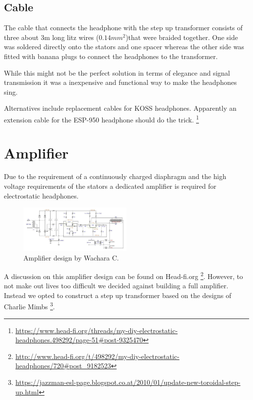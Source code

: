 \documentclass{article}
\begin{document}
\subsection{Cable}
The cable that connects the headphone with the step up transformer consists of three about 3m long litz wires ($0.14mm^2$)that were braided together. One side was soldered directly onto the stators and one spacer whereas the other side was fitted with banana plugs to connect the headphones to the transformer.

While this might not be the perfect solution in terms of elegance and signal transmission it was a inexpensive and functional way to make the headphones sing.

Alternatives include replacement cables for KOSS headphones. Apparently an extension cable for the ESP-950 headphone should do the trick. \footnote{\url{https://www.head-fi.org/threads/my-diy-electrostatic-headphones.498292/page-51#post-9325470}}


\section{Amplifier}
\label{s:amp}
Due to the requirement of a continuously charged diaphragm and the high voltage requirements of the stators a dedicated amplifier is required for electrostatic headphones.
\begin{figure}[htb]
    \centering
    \includegraphics[width=0.5\textwidth]{images/wachara-amp.png}
    \caption{Amplifier design by Wachara C.}
    \label{f:amp:wachara}
\end{figure}
A discussion on this amplifier design can be found on Head-fi.org \footnote{\url{http://www.head-fi.org/t/498292/my-diy-electrostatic-headphones/720#post_9182523}}. However, to not make out lives too difficult we decided against building a full amplifier. Instead we opted to construct a step up transformer based on the designs of Charlie Mimbs \footnote{\url{https://jazzman-esl-page.blogspot.co.at/2010/01/update-new-toroidal-step-up.html}}.
\end{document}
